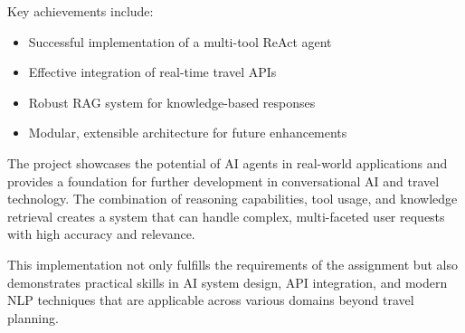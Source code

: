 \documentclass[12pt,a4paper]{article}
\begin{document}
Key achievements include:
\begin{itemize}
\item Successful implementation of a multi-tool ReAct agent
\item Effective integration of real-time travel APIs
\item Robust RAG system for knowledge-based responses
\item Modular, extensible architecture for future enhancements
\end{itemize}

The project showcases the potential of AI agents in real-world applications and provides a foundation for further development in conversational AI and travel technology. The combination of reasoning capabilities, tool usage, and knowledge retrieval creates a system that can handle complex, multi-faceted user requests with high accuracy and relevance.

This implementation not only fulfills the requirements of the assignment but also demonstrates practical skills in AI system design, API integration, and modern NLP techniques that are applicable across various domains beyond travel planning.
\end{document}
